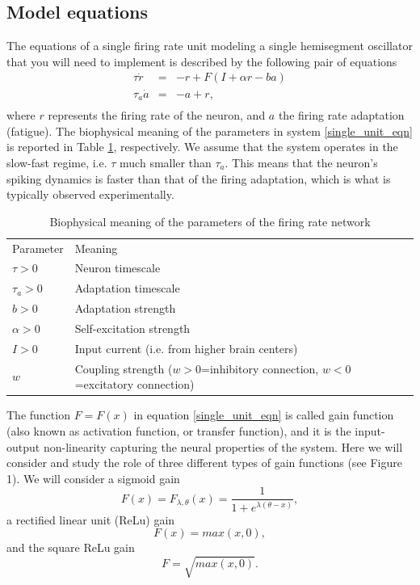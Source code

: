 \documentclass{cmc}
\begin{document}
\subsection*{Model equations}

The equations of a single firing rate unit modeling a single hemisegment oscillator that you will need to implement is described by the following pair of equations
\begin{equation}
    \begin{array}{lcl}
    \tau \dot{r} & = & -r + F(I + \alpha r - b a) \\
    \tau_a \dot{a} & = & -a + r, \\
    \end{array}
    \label{single_unit_eqn}
\end{equation}
where $r$ represents the firing rate of the neuron, and $a$ the firing rate adaptation (fatigue). The biophysical meaning of the parameters in system \ref{single_unit_eqn} is reported in Table \ref{table_par}, respectively. We assume that the system operates in the slow-fast regime, i.e. $\tau$ much smaller than $\tau_a$. This means that the neuron's spiking dynamics is faster than that of the firing adaptation, which is what is typically observed experimentally.

\begin{table}[h!]
\centering
\begin{tabular}{ l l }
 Parameter & Meaning \\
 $\tau>0$ & Neuron timescale \\
 $\tau_a>0$ & Adaptation timescale \\
 $b>0$ & Adaptation strength \\
 $\alpha>0$ & Self-excitation strength\\
 $I>0$ & Input current (i.e. from higher brain centers) \\
 $w$ & Coupling strength  ($w>0$=inhibitory connection, $w<0$=excitatory connection)
\end{tabular}
\caption{Biophysical meaning of the parameters of the firing rate network}
\label{table_par}
\end{table}

The function $F=F(x)$ in equation \ref{single_unit_eqn} is called gain function (also known as activation function, or transfer function), and it is the input-output non-linearity capturing the neural properties of the system. Here we will consider and study the role of three different types of gain functions (see Figure 1). We will consider a sigmoid gain
\begin{equation}
F(x)=F_{\lambda,\theta}(x)=\frac{1}{1+e^{\lambda (\theta-x)}},
\label{sigmoid_eq}
\end{equation}
a rectified linear unit (ReLu) gain
\begin{equation}
F(x)=max(x,0),
\label{ReLu_eq}
\end{equation}
and the square ReLu gain
\begin{equation}
F=\sqrt{max(x,0)}.
\label{SReLu_eq}
\end{equation}
\end{document}
